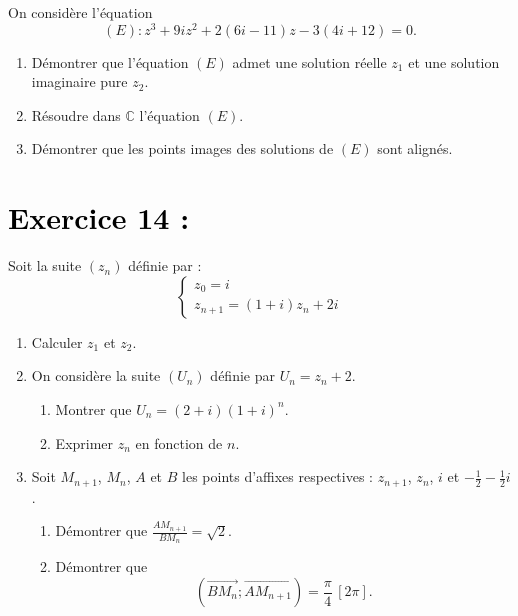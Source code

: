 \documentclass[12pt]{article}
\begin{document}
On considère l’équation 
\[
(E) : z^3 + 9iz^2 + 2(6i - 11)z - 3(4i + 12) = 0.
\]

\begin{enumerate}
    \item Démontrer que l’équation $(E)$ admet une solution réelle $z_1$ et une solution imaginaire pure $z_2$.

    \item Résoudre dans $\mathbb{C}$ l’équation $(E)$.

    \item Démontrer que les points images des solutions de $(E)$ sont alignés.
\end{enumerate}

\section*{\textcolor{black}{Exercice 14 :}}

Soit la suite $(z_n)$ définie par :
\[
\begin{cases}
z_0 = i \\
z_{n+1} = (1 + i)z_n + 2i
\end{cases}
\]

\begin{enumerate}
    \item Calculer $z_1$ et $z_2$.

    \item On considère la suite $(U_n)$ définie par $U_n = z_n + 2$.
    \begin{enumerate}
        \item Montrer que $U_n = (2 + i)(1 + i)^n$.
        \item Exprimer $z_n$ en fonction de $n$.
    \end{enumerate}

    \item Soit $M_{n+1}$, $M_n$, $A$ et $B$ les points d’affixes respectives : $z_{n+1}$, $z_n$, $i$ et $-\frac{1}{2} - \frac{1}{2}i$.

    \begin{enumerate}
        \item Démontrer que $\frac{AM_{n+1}}{BM_n} = \sqrt{2}$.
        \item Démontrer que 
        \[
        (\overrightarrow{BM_n}; \overrightarrow{AM_{n+1}}) = \frac{\pi}{4} \, [2\pi].
        \]
    \end{enumerate}
\end{enumerate}
\end{document}
